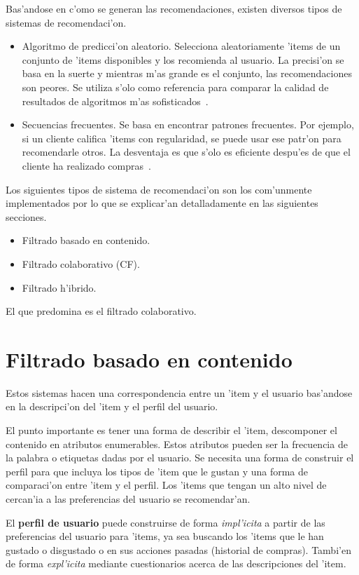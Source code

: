 \documentclass[11pt]{article}
\begin{document}
Bas'andose en c'omo se generan las recomendaciones, existen diversos tipos de sistemas de recomendaci'on.
\begin{itemize}
\item Algoritmo de predicci'on aleatorio. Selecciona aleatoriamente 'items de un conjunto de 'items disponibles y los recomienda al usuario. La precisi'on se basa en la suerte y mientras m'as grande es el conjunto, las recomendaciones son peores. Se utiliza s'olo como referencia para comparar la calidad de resultados de algoritmos m'as sofisticados~\cite{almazrorecsys}.
\item Secuencias frecuentes. Se basa en encontrar patrones frecuentes. Por ejemplo, si un cliente califica 'items con regularidad, se puede usar ese patr'on para recomendarle otros. La desventaja es que s'olo es eficiente despu'es de que el cliente ha realizado compras~\cite{almazrorecsys}.
\end{itemize}

Los siguientes tipos de sistema de recomendaci'on son los com'unmente implementados por lo que se explicar'an detalladamente en las siguientes secciones.

\begin{itemize}
\item Filtrado basado en contenido.
\item Filtrado colaborativo (CF).
\item Filtrado h'ibrido.
\end{itemize}

El que predomina es el filtrado colaborativo.

\section{Filtrado basado en contenido}
Estos sistemas hacen una correspondencia entre un 'item y el usuario bas'andose en la descripci'on del 'item y el perfil del usuario.

El punto importante es tener una forma de describir el 'item, descomponer el contenido en atributos enumerables. Estos atributos pueden ser la frecuencia de la palabra o etiquetas dadas por el usuario. Se necesita una forma de construir el perfil para que incluya los tipos de 'item que le gustan y una forma de comparaci'on entre 'item y el perfil. Los 'items que tengan un alto nivel de cercan'ia a las preferencias del usuario se recomendar'an.

El \textbf{perfil de usuario} puede construirse de forma \textit{impl'icita} a partir de las preferencias del usuario para 'items, ya sea buscando los 'items que le han gustado o disgustado o en sus acciones pasadas (historial de compras). Tambi'en de forma \textit{expl'icita} mediante cuestionarios acerca de las descripciones del 'item.
\end{document}
